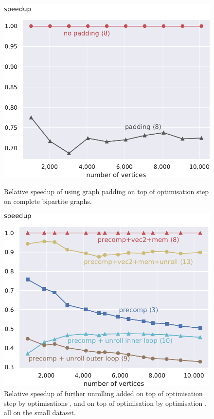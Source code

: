 \documentclass[final,letterpaper]{article}
\begin{document}
\begin{figure}[!t]
\begin{minipage}[t]{\oldlinewidth}\centering
	\includegraphics[width=\linewidth]{img/speedup[8]padding_bipartite.pdf}
	\caption{Relative speedup of using graph padding on top of optimisation step  on complete bipartite graphs. \label{speedupGraphPaddingBipartite}}
\end{minipage}%
\hspace{7.2mm}
\begin{minipage}[t]{\oldlinewidth}\centering
	\includegraphics[width=\linewidth]{img/speedup[3][8][9][10][13]_small.pdf}
	\caption{Relative speedup of further unrolling added on top of optimisation step  by optimisations , and on top of optimisation  by optimisation , all on the small dataset. \label{speedupUnsuccessful}}
\end{minipage}%
\end{figure}
\end{document}
